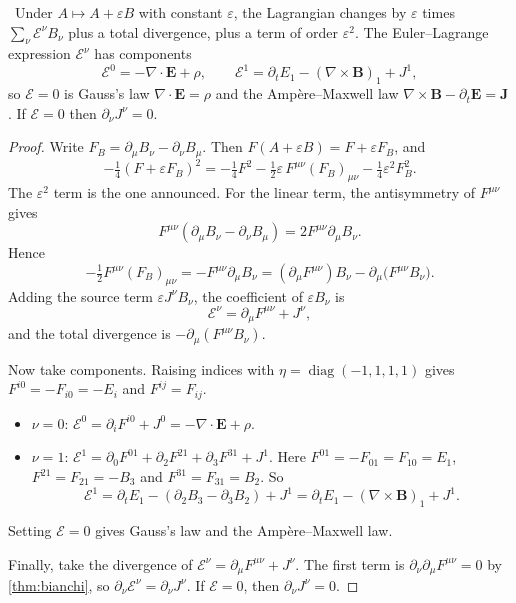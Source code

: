 \begin{theorem}\label{thm:maxwellvar}\ver\
Under $A\mapsto A+\varepsilon B$ with constant $\varepsilon$, the Lagrangian changes by $\varepsilon$ times $\sum_\nu\mathcal E^\nu B_\nu$ plus a total divergence, plus a term of order $\varepsilon^2$. The Euler--Lagrange expression $\mathcal E^\nu$ has components
\[
\mathcal E^0=-\nabla\cdot\mathbf E+\rho,\qquad \mathcal E^1=\partial_tE_1-(\nabla\times\mathbf B)_1+J^1,
\]
so $\mathcal E=0$ is Gauss's law $\nabla\cdot\mathbf E=\rho$ and the Amp\`ere--Maxwell law $\nabla\times\mathbf B-\partial_t\mathbf E=\mathbf J$. If $\mathcal E=0$ then $\partial_\nu J^\nu=0$.
\end{theorem}
\begin{proof}
Write $F_B=\partial_\mu B_\nu-\partial_\nu B_\mu$. Then $F(A+\varepsilon B)=F+\varepsilon F_B$, and
\[
-\tfrac14(F+\varepsilon F_B)^2=-\tfrac14F^2-\tfrac12\varepsilon\,F^{\mu\nu}(F_B)_{\mu\nu}-\tfrac14\varepsilon^2F_B^2 .
\]
The $\varepsilon^2$ term is the one announced. For the linear term, the antisymmetry of $F^{\mu\nu}$ gives
\[
F^{\mu\nu}(\partial_\mu B_\nu-\partial_\nu B_\mu)=2F^{\mu\nu}\partial_\mu B_\nu .
\]
Hence
\[
-\tfrac12F^{\mu\nu}(F_B)_{\mu\nu}=-F^{\mu\nu}\partial_\mu B_\nu=(\partial_\mu F^{\mu\nu})B_\nu-\partial_\mu\bigl(F^{\mu\nu}B_\nu\bigr).
\]
Adding the source term $\varepsilon J^\nu B_\nu$, the coefficient of $\varepsilon B_\nu$ is
\[
\mathcal E^\nu=\partial_\mu F^{\mu\nu}+J^\nu ,
\]
and the total divergence is $-\partial_\mu(F^{\mu\nu}B_\nu)$.

Now take components. Raising indices with $\eta=\operatorname{diag}(-1,1,1,1)$ gives $F^{i0}=-F_{i0}=-E_i$ and $F^{ij}=F_{ij}$.
\begin{itemize}[nosep]
\item $\nu=0$: $\mathcal E^0=\partial_iF^{i0}+J^0=-\nabla\cdot\mathbf E+\rho$.
\item $\nu=1$: $\mathcal E^1=\partial_0F^{01}+\partial_2F^{21}+\partial_3F^{31}+J^1$. Here $F^{01}=-F_{01}=F_{10}=E_1$, $F^{21}=F_{21}=-B_3$ and $F^{31}=F_{31}=B_2$. So
\[
\mathcal E^1=\partial_tE_1-(\partial_2B_3-\partial_3B_2)+J^1=\partial_tE_1-(\nabla\times\mathbf B)_1+J^1 .
\]
\end{itemize}
Setting $\mathcal E=0$ gives Gauss's law and the Amp\`ere--Maxwell law.

Finally, take the divergence of $\mathcal E^\nu=\partial_\mu F^{\mu\nu}+J^\nu$. The first term is $\partial_\nu\partial_\mu F^{\mu\nu}=0$ by \cref{thm:bianchi}, so $\partial_\nu\mathcal E^\nu=\partial_\nu J^\nu$. If $\mathcal E=0$, then $\partial_\nu J^\nu=0$.
\end{proof}


